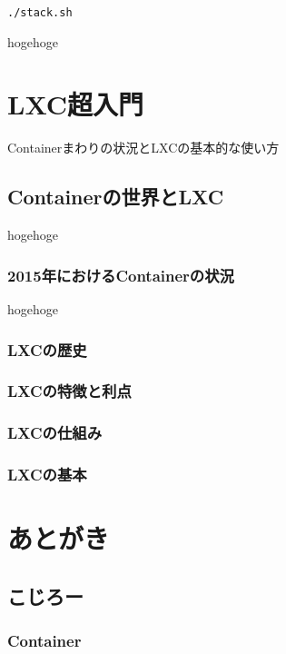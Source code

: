 \documentclass[9pt,b5paper,tombo]{jsbook}
\begin{document}
\begin{lstlisting}
./stack.sh
\end{lstlisting}

hogehoge

\chapter{LXC超入門}

Containerまわりの状況とLXCの基本的な使い方

\section{Containerの世界とLXC}

hogehoge

\subsection{2015年におけるContainerの状況}

hogehoge

\subsection{LXCの歴史}

\subsection{LXCの特徴と利点}

\subsection{LXCの仕組み}

\subsection{LXCの基本}

\chapter{あとがき}

\section{こじろー}

\subsection{Container}
\end{document}
